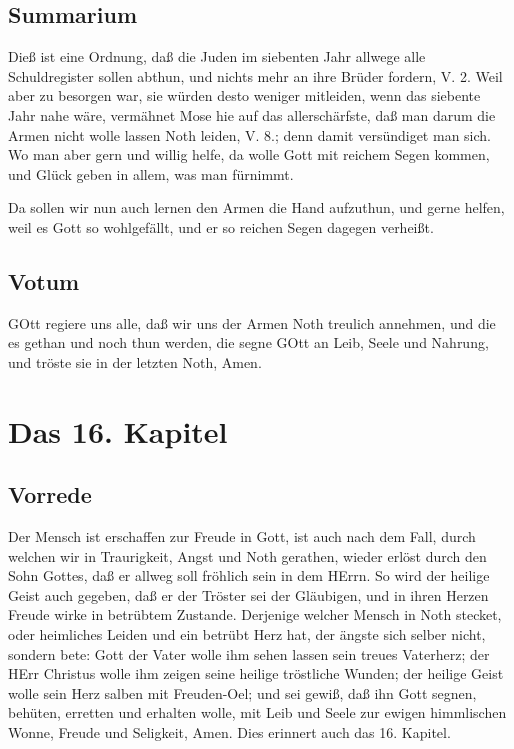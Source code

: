 \section{Summarium}

Dieß ist eine Ordnung, daß die Juden im siebenten Jahr allwege alle Schuldregister sollen abthun, und nichts mehr an ihre Brüder fordern, V. 2. Weil aber zu besorgen war, sie würden desto weniger mitleiden, wenn das siebente Jahr nahe wäre, vermähnet Mose hie auf das allerschärfste, daß man darum die Armen nicht wolle lassen Noth leiden, V. 8.; denn damit versündiget man sich. Wo man aber gern und willig helfe, da wolle Gott mit reichem Segen kommen, und Glück geben in allem, was man fürnimmt.

Da sollen wir nun auch lernen den Armen die Hand aufzuthun, und gerne helfen, weil es Gott so wohlgefällt, und er so reichen Segen dagegen verheißt.

\section{Votum}

GOtt regiere uns alle, daß wir uns der Armen Noth treulich annehmen, und die es gethan und noch thun werden, die segne GOtt an Leib, Seele und Nahrung, und tröste sie in der letzten Noth, Amen.

\chapter{Das 16. Kapitel}

\section{Vorrede}

Der Mensch ist erschaffen zur Freude in Gott, ist auch nach dem Fall, durch welchen wir in Traurigkeit, Angst und Noth gerathen, wieder erlöst durch den Sohn Gottes, daß er allweg soll fröhlich sein in dem HErrn. So wird der heilige Geist auch gegeben, daß er der Tröster sei der Gläubigen, und in ihren Herzen Freude wirke in betrübtem Zustande. Derjenige welcher Mensch in Noth stecket, oder heimliches Leiden und ein betrübt Herz hat, der ängste sich selber nicht, sondern bete: Gott der Vater wolle ihm sehen lassen sein treues Vaterherz; der HErr Christus wolle ihm zeigen seine heilige tröstliche Wunden; der heilige Geist wolle sein Herz salben mit Freuden-Oel; und sei gewiß, daß ihn Gott segnen, behüten, erretten und erhalten wolle, mit Leib und Seele zur ewigen himmlischen Wonne, Freude und Seligkeit, Amen. Dies erinnert auch das 16. Kapitel.

